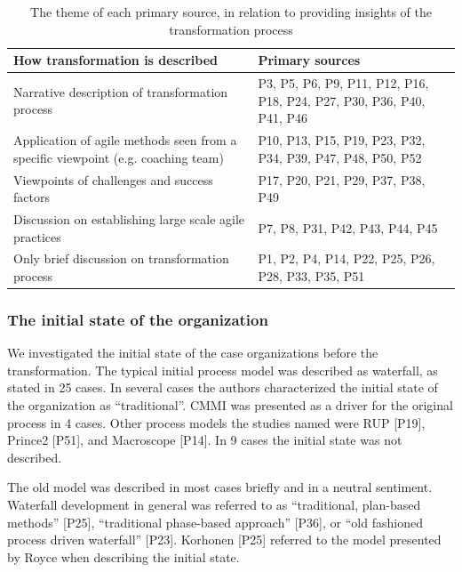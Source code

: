 \documentclass[preprint,authoryear,12pt]{elsarticle}
\begin{document}
\begin{table}[h]
    \centering
    \begin{tabular}{ >{\raggedright\arraybackslash}p{}
                     >{\raggedright\arraybackslash}p{} }
        \toprule
        How transformation is described   &  Primary sources  \\
        \midrule
        Narrative description of transformation process &
                P3, P5, P6, P9, P11, P12, P16, P18,
                P24, P27, P30, P36, P40, P41, P46   \\
        Application of agile methods seen from a specific viewpoint (e.g. coaching team) &
                P10, P13, P15, P19, P23, P32, P34,
                P39, P47, P48, P50, P52    \\
        Viewpoints of challenges and success factors  &
                P17, P20, P21, P29, P37, P38, P49   \\
        Discussion on establishing large scale agile practices  &
                P7, P8, P31, P42, P43, P44, P45   \\
        Only brief discussion on transformation process  &
                P1, P2, P4, P14, P22, P25, P26, P28, P33, P35, P51  \\
        \bottomrule
    \end{tabular}
    \caption{The theme of each primary source, in relation to providing
             insights of the transformation process}
    \label{table:transformation_descriptiontypes}
\end{table}


\subsubsection{The initial state of the organization}

We investigated the initial state of the case organizations before the
transformation. The typical initial process model was described as waterfall, as
stated in 25 cases. In several cases the authors characterized the initial state
of the organization as ``traditional''. CMMI was presented as a driver for the
original process in 4 cases. Other process models the studies named were RUP
[P19], Prince2 [P51], and Macroscope [P14]. In 9 cases the initial state was not
described.

The old model was described in most cases briefly and in a neutral sentiment.
Waterfall development in general was referred to as ``traditional, plan-based
methods'' [P25], ``traditional phase-based approach'' [P36], or ``old fashioned
process driven waterfall'' [P23]. Korhonen [P25] referred to the model presented
by Royce \cite{Royce1970} when describing the initial state.
\end{document}
